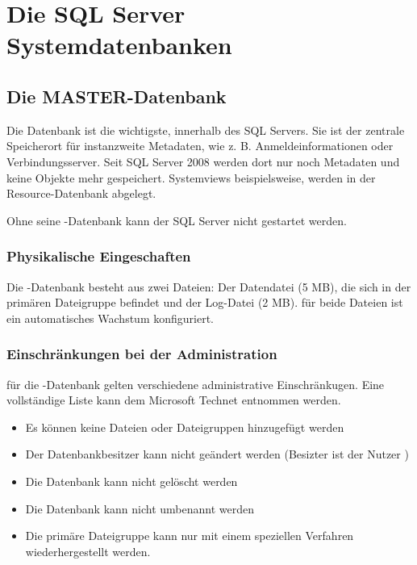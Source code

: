     \section{Die SQL Server Systemdatenbanken}
      \subsection{Die MASTER-Datenbank}
        Die Datenbank  ist die wichtigste, innerhalb des SQL
        Servers. Sie ist der zentrale Speicherort f\"ur instanzweite Metadaten,
        wie z. B. Anmeldeinformationen oder Verbindungsserver. Seit SQL Server
        2008 werden dort nur noch Metadaten und keine Objekte mehr gespeichert.
        Systemviews beispielsweise, werden in der Resource-Datenbank
         abgelegt.
        \begin{merke}
          Ohne seine -Datenbank kann der SQL Server nicht
          gestartet werden.
        \end{merke}
        \subsubsection{Physikalische Eingeschaften}
          Die -Datenbank besteht aus zwei Dateien: Der
          Datendatei  (5 MB), die sich in der primären
          Dateigruppe befindet und der Log-Datei  (2 MB).
          f\"ur beide Dateien ist ein automatisches Wachstum konfiguriert.
        \subsubsection{Einschränkungen bei der Administration}
          f\"ur die -Datenbank gelten verschiedene
          administrative Einschränkugen. Eine vollständige Liste kann dem
          Microsoft Technet entnommen werden.
          \begin{itemize}
            \item Es können keine Dateien oder Dateigruppen hinzugefügt werden
            \item Der Datenbankbesitzer kann nicht geändert werden (Besizter
            ist der Nutzer )
            \item Die Datenbank kann nicht gelöscht werden
            \item Die Datenbank kann nicht umbenannt werden
            \item Die primäre Dateigruppe kann nur mit einem
            speziellen Verfahren wiederhergestellt werden.
          \end{itemize}
